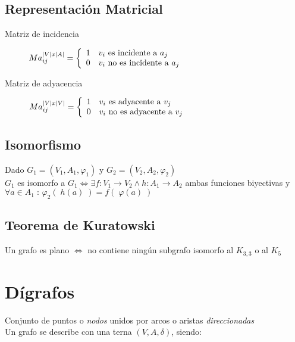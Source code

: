 \documentclass[a4paper]{article}
\numberwithin{equation}{section}
\numberwithin{figure}{section}
\numberwithin{table}{section}
\newcommand{\refa}[1]{}
\newcommand{\talque}{\;:\,} %
\begin{document}
\subsection{Representaci\'on Matricial}
\begin{description}
	\item[Matriz de incidencia] $Ma_{ij}^{|V|x|A|} = \left\{
\begin{array}{c l}
 1 & v_i\textup{ es incidente\refa{incidente} a } a_j\\
 0 & v_i\textup{ no es incidente\refa{incidente} a } a_j\\
\end{array}
\right.
$
    \item[Matriz de adyacencia]$Ma_{ij}^{|V|x|V|} = \left\{
\begin{array}{c l}
 1 & v_i\textup{ es adyacente\refa{adyacente} a } v_j\\
 0 & v_i\textup{ no es adyacente\refa{adyacente} a } v_j\\
\end{array}
\right.
$
\end{description}

\subsection{Isomorfismo}\label{isomorfo}
Dado $G_1 = (V_1, A_1, \varphi_1)$ y $G_2 = (V_2, A_2, \varphi_2)$ \\
$G_1$ es isomorfo a $G_1 \iff \exists f:V_1 \to V_2 \land h: A_1 \to A_2$ ambas funciones biyectivas y $\forall a \in A_1 \talque \varphi_2( \;h(a) \;) = f(\; \varphi(a) \;)$

\subsection{Teorema de Kuratowski}
Un grafo es plano $\iff$ no contiene ning\'un subgrafo\refa{subgrafo} isomorfo\refa{isomorfo} al $K_{3,3}$ o al $K_5$


\section{D\'igrafos}
Conjunto de puntos o \emph{nodos} unidos por arcos o aristas \emph{direccionadas}\\
Un grafo se describe con una terna $(V,A,\delta )$, siendo:
\end{document}

